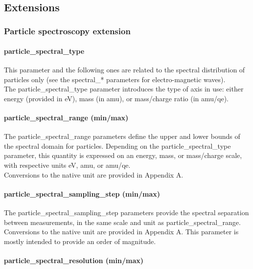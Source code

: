 \documentclass[11pt,a4paper]{ivoa}
\begin{document}
 

\subsection{Extensions}

\subsubsection{Particle spectroscopy extension}

\paragraph{particle\_spectral\_type}

This parameter and the following ones are related to the spectral distribution of particles only (see the spectral\_* parameters for electro-magnetic waves).\\ The particle\_spectral\_type parameter introduces the type of axis in use: either energy (provided in eV), mass (in amu), or mass/charge ratio (in amu/qe).

\paragraph{particle\_spectral\_range (min/max)}

The particle\_spectral\_range parameters define the upper and lower bounds of the spectral domain for particles. Depending on the particle\_spectral\_type parameter, this quantity is expressed on an energy, mass, or mass/charge scale, with respective units eV, amu, or amu/qe. \\ Conversions to the native unit are provided in Appendix A.

\paragraph{particle\_spectral\_sampling\_step (min/max)}

The particle\_spectral\_sampling\_step parameters provide the spectral separation between measurements, in the same scale and unit as particle\_spectral\_range.\\ Conversions to the native unit are provided in Appendix A. This parameter is mostly intended to provide an order of magnitude.

\paragraph{particle\_spectral\_resolution (min/max)}
\end{document}
